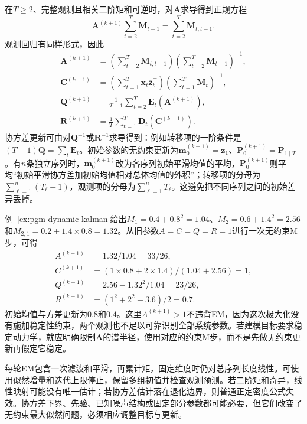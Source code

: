 在$T\geq2$、完整观测且相关二阶矩和可逆时，对$\bm A$求导得到正规方程
\[
  \bm A^{(k+1)}\sum_{t=2}^{T}\bm M_{t-1}
    =\sum_{t=2}^{T}\bm M_{t,t-1}.
\]
观测回归有同样形式，因此
\begin{equation}
  \begin{aligned}
    \bm A^{(k+1)}
      &=\left(\sum_{t=2}^{T}\bm M_{t,t-1}\right)
        \left(\sum_{t=2}^{T}\bm M_{t-1}\right)^{-1},\\
    \bm C^{(k+1)}
      &=\left(\sum_{t=1}^{T}
        \bm x_t\overline{\bm z}_t^\top\right)
        \left(\sum_{t=1}^{T}\bm M_t\right)^{-1},\\
    \bm Q^{(k+1)}
      &=\frac{1}{T-1}\sum_{t=2}^{T}
        \bm E_t(\bm A^{(k+1)}),\\
    \bm R^{(k+1)}
      &=\frac{1}{T}\sum_{t=1}^{T}
        \bm D_t(\bm C^{(k+1)}).
  \end{aligned}
  \label{eq:pgm-dynamic-lgssm-m-step}
\end{equation}
协方差更新可由对$\bm Q^{-1}$或$\bm R^{-1}$求导得到：例如转移项的一阶条件是$(T-1)\bm Q=\sum_t\bm E_t$。初始参数的无约束更新为$\bm m_0^{(k+1)}=\overline{\bm z}_1$、$\bm P_0^{(k+1)}=\bm P_{1\mid T}$。有$n$条独立序列时，$\bm m_0^{(k+1)}$改为各序列初始平滑均值的平均，$\bm P_0^{(k+1)}$则平均“初始平滑协方差加初始均值相对总体均值的外积”；转移项的分母为$\sum_{\ell=1}^{n}(T_\ell-1)$，观测项的分母为$\sum_{\ell=1}^{n}T_\ell$。这避免把不同序列之间的初始差异丢掉。

例~\ref{ex:pgm-dynamic-kalman}给出$M_1=0.4+0.8^2=1.04$、$M_2=0.6+1.4^2=2.56$和$M_{2,1}=0.2+1.4\times0.8=1.32$。从旧参数$A=C=Q=R=1$进行一次无约束M步，可得
\[
  \begin{aligned}
    A^{(k+1)}&=1.32/1.04=33/26,\\
    C^{(k+1)}&=(1\times0.8+2\times1.4)/(1.04+2.56)=1,\\
    Q^{(k+1)}&=2.56-1.32^2/1.04=23/26,\\
    R^{(k+1)}&=(1^2+2^2-3.6)/2=0.7.
  \end{aligned}
\]
初始均值与方差更新为$0.8$和$0.4$。这里$A^{(k+1)}>1$不违背EM，因为这次极大化没有施加稳定性约束，两个观测也不足以可靠识别全部系统参数。若建模目标要求稳定动力学，就应明确限制$\bm A$的谱半径，使用对应的约束M步，而不是先做无约束更新再假定它稳定。

每轮EM包含一次滤波和平滑，再累计矩，固定维度时仍对总序列长度线性。可使用似然增量和迭代上限停止，保留多组初值并检查观测预测。若二阶矩和奇异，线性映射可能没有唯一估计；若协方差估计落在退化边界，则普通正定密度公式失效。协方差下界、先验、已知噪声结构或固定部分参数都可能必要，但它们改变了无约束最大似然问题，必须相应调整目标与更新。

